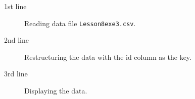 \begin{description}
	\item[1st line] Reading data file \texttt{Lesson8exe3.csv}.
	\item[2nd line] Restructuring the data with the id column as the key.
	\item[3rd line] Displaying the data.
\end{description}
